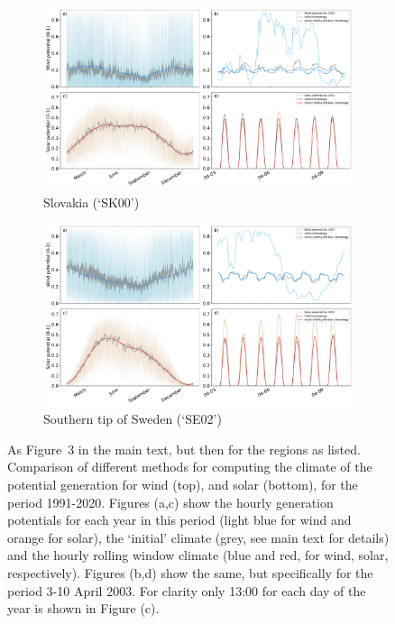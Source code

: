 \documentclass[12pt]{iopart}
\begin{document}
\begin{figure}[hb]
    \centering
    \begin{subfigure}[t]{0.9\linewidth}
        \centering
        \includegraphics[width=\textwidth]{additional_regions/Climatology_v2_SK00.pdf}
        \caption{Slovakia (`SK00')}
    \end{subfigure}
    \begin{subfigure}[t]{0.9\linewidth}
        \centering
        \includegraphics[width=\textwidth]{additional_regions/Climatology_v2_SE02.pdf}
        \caption{Southern tip of Sweden (`SE02')}
    \end{subfigure}
    \caption{
        As Figure~3 in the main text, but then for the regions as listed.
        Comparison of different methods for computing the climate of the potential generation for wind (top), and solar (bottom), for the period 1991-2020. 
        Figures (a,c) show the hourly generation potentials for each year in this period (light blue for wind and orange for solar), the `initial' climate (grey, see main text for details) and the hourly rolling window climate (blue and red, for wind, solar, respectively). 
        Figures (b,d) show the same, but specifically for the period 3-10 April 2003. 
        For clarity only 13:00 for each day of the year is shown in Figure (c).}
    \label{SIfig:climate_other-regions}
\end{figure}
\end{document}
